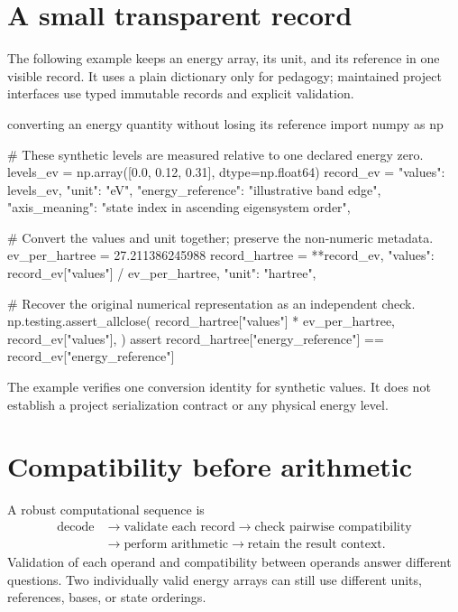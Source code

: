 \section{A small transparent record}

The following example keeps an energy array, its unit, and its reference in one
visible record. It uses a plain dictionary only for pedagogy; maintained project
interfaces use typed immutable records and explicit validation.

\begin{pythonexample}{converting an energy quantity without losing its reference}
import numpy as np

# These synthetic levels are measured relative to one declared energy zero.
levels_ev = np.array([0.0, 0.12, 0.31], dtype=np.float64)
record_ev = {
    "values": levels_ev,
    "unit": "eV",
    "energy_reference": "illustrative band edge",
    "axis_meaning": "state index in ascending eigensystem order",
}

# Convert the values and unit together; preserve the non-numeric metadata.
ev_per_hartree = 27.211386245988
record_hartree = {
    **record_ev,
    "values": record_ev["values"] / ev_per_hartree,
    "unit": "hartree",
}

# Recover the original numerical representation as an independent check.
np.testing.assert_allclose(
    record_hartree["values"] * ev_per_hartree,
    record_ev["values"],
)
assert record_hartree["energy_reference"] == record_ev["energy_reference"]
\end{pythonexample}

The example verifies one conversion identity for synthetic values. It does not
establish a project serialization contract or any physical energy level.


\section{Compatibility before arithmetic}

A robust computational sequence is
\begin{equation}
\begin{aligned}
  \text{decode}
  &\longrightarrow \text{validate each record}
  \longrightarrow \text{check pairwise compatibility}\\
  &\longrightarrow \text{perform arithmetic}
  \longrightarrow \text{retain the result context}.
\end{aligned}
\end{equation}
Validation of each operand and compatibility between operands answer different
questions. Two individually valid energy arrays can still use different units,
references, bases, or state orderings.

